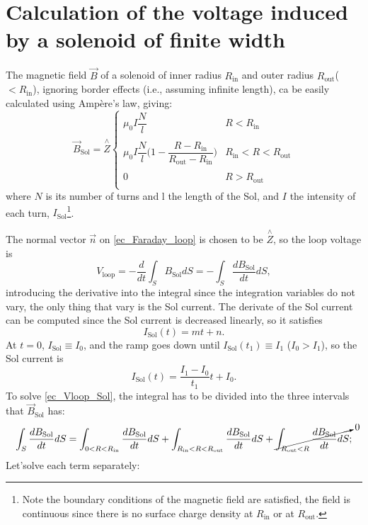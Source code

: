 \documentclass[a4paper,12pt,oneside]{book}
\begin{document}
\chapter{Calculation of the voltage induced by a solenoid of finite width}
\label{appendix_loop voltage}
The magnetic field $\vec{B}$ of a solenoid of inner radius $R_\text{in}$ and outer radius $R_\text{out}$($<R_\text{in}$), ignoring border effects (i.e., assuming infinite length), ca be easily calculated using Ampère's law, giving:
%
\begin{equation}
\vec{B}_\text{Sol}= \stackrel{\wedge}{Z}
\left\{
	\begin{array}{cc}
	\mu_0 I \dfrac{N}{l} & R < R_\text{in} \\
	\\
	 \mu_0 I \dfrac{N}{l} \Big(1- \dfrac{R-R_\text{in}}{R_\text{out}-R_\text{in}} \Big)  & R_\text{in}<R<R_\text{out} \\ 
	 \\
	0 & R> R_\text{out} \\
	\end{array}
\right.
\end{equation}
where $N$ is its number of turns and l the length of the Sol, and $I$ the intensity of each turn, $I_\text{Sol}$\footnote{Note the boundary conditions of the magnetic field are satisfied, the field is continuous since there is no surface charge density at $R_\text{in}$ or at $R_\text{out}$.}.

The normal vector $\vec{n}$ on \eqref{ec_Faraday_loop} is chosen to be $ \stackrel{\wedge}{Z}$, so the loop voltage is
%
\begin{equation}
V_\text{loop} = - \dfrac{d}{dt} \int_S B_\text{Sol} dS= - \int_S \dfrac{d B_\text{Sol}}{dt} dS,
\end{equation}
introducing the derivative into the integral since the integration variables do not vary, the only thing that vary is the Sol current. The derivate of the Sol current can be computed since the Sol current is decreased linearly, so it satisfies
%
\begin{equation}\label{ec_I_sol}
I_\text{Sol}(t)=m t +n.
\end{equation}
At $t=0$, $I_\text{Sol} \equiv I_0$, and the ramp goes down until $I_\text{Sol}(t_1) \equiv  I_1$ ($I_0>I_1$), so the Sol current is
%
\begin{equation}
I_\text{Sol}(t)=\dfrac{I_1-I_0}{t_1} t +I_0.
\end{equation}
To solve \eqref{ec_Vloop_Sol}, the integral has to be divided into the three intervals that $\vec{B}_\text{Sol}$ has:
%
\begin{equation}
\int_S \dfrac{d B_\text{Sol}}{dt} dS=\int_{0<R<R_\text{in}} \dfrac{d B_\text{Sol}}{dt} dS + \int_{R_\text{in}<R<R_\text{out}} \dfrac{d B_\text{Sol}}{dt} dS+ \cancelto{0}{\int_{R_\text{out}<R} \dfrac{d B_\text{Sol}}{dt} dS};
\end{equation}
Let'solve each term separately:
\end{document}
